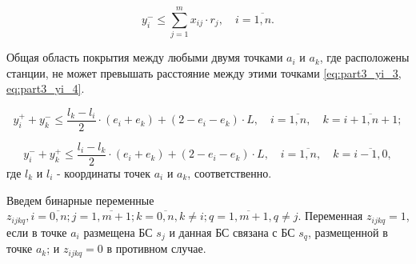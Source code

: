 \begin{equation}
  \label{eq:part3_yi_2}
  y_i^- \leq \sum\limits_{j=1}^m x_{ij} \cdot r_j, \quad i = \overline{1,n}. 
\end{equation}

Общая область покрытия между любыми двумя точками $ a_i $ и $ a_k $, где расположены станции, не может превышать расстояние между этими точками \cref{eq:part3_yi_3, eq:part3_yi_4}.

\begin{equation}
  \label{eq:part3_yi_3}
  y_i^+ + y_k^- \leq \frac{l_k - l_i}{2} \cdot (e_i + e_k ) + (2 - e_i - e_k ) \cdot L, \quad i = \overline{1,n},  \quad k = \overline{i+1,n+1};
\end{equation}

\begin{equation}
  \label{eq:part3_yi_4}
  y_i^- + y_k^+  \leq \frac{l_i-l_k}{2} \cdot (e_i + e_k) + (2 - e_i - e_k) \cdot L, \quad i = \overline{1,n}, \quad k = \overline{i-1,0},
\end{equation}
где $ l_k $ и $ l_i $ - координаты точек $ a_i $ и $ a_k $, соответственно. 


Введем бинарные переменные $z_{ijkq}, i = \overline{0,n}; j= \overline{1,m+1}; k=\overline{0,n},  k \neq i; q= \overline{1,m+1}, q \neq j$. Переменная $ z_ {ijkq} = 1$, если в точке $ a_i $ размещена БС $ s_j $ и данная БС связана с БС $ s_q $, размещенной в точке $ a_k $; и $ z_ {ijkq} = 0 $ в противном случае.
%


